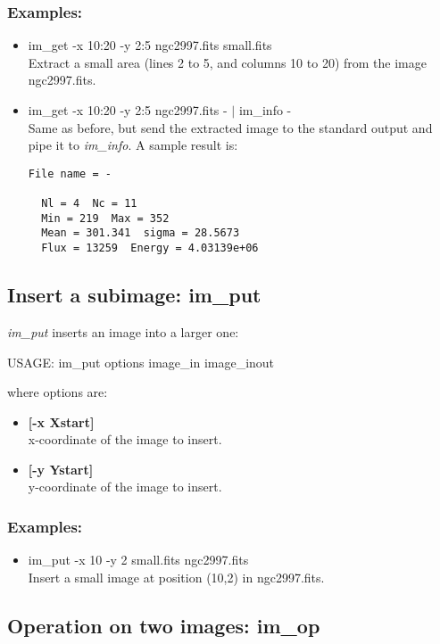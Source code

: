 \subsubsection*{Examples:}
\begin{itemize}
\item im\_get  -x 10:20 -y 2:5 ngc2997.fits small.fits \\
Extract a small area (lines 2 to 5, and columns 10 to 20) from the
image ngc2997.fits.
\item im\_get -x 10:20 -y 2:5 ngc2997.fits - $\mid$ im\_info - \\
Same as before, but send the extracted image to the standard output and
pipe it to {\em im\_info}. A sample result is:
\begin{verbatim}
File name = -
 
  Nl = 4  Nc = 11
  Min = 219  Max = 352
  Mean = 301.341  sigma = 28.5673
  Flux = 13259  Energy = 4.03139e+06
\end{verbatim}
\end{itemize}

\subsection{Insert a subimage: im\_put}

{\em im\_put} inserts an image into a larger one:
{\bf
\begin{center}
USAGE: im\_put options image\_in  image\_inout
\end{center}
}
where options are:
\begin{itemize}
\item {\bf[-x Xstart]} \\
x-coordinate of the image to insert.
\item {\bf[-y Ystart]} \\
y-coordinate of the image to insert.
\end{itemize}
\subsubsection*{Examples:}
\begin{itemize}
\item im\_put  -x 10 -y 2 small.fits ngc2997.fits \\
Insert a small image at position (10,2) in ngc2997.fits. 
\end{itemize}

\subsection{Operation on two images: im\_op}

